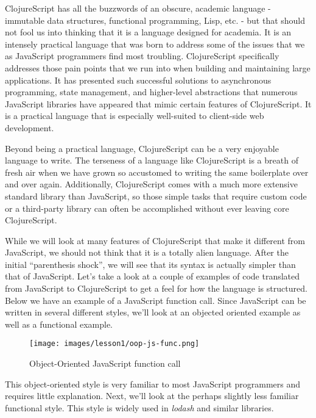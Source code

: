 \documentclass[10pt,twoside,openright]{memoir}
\begin{document}
ClojureScript has all the buzzwords of an obscure, academic language -
immutable data structures, functional programming, Lisp, etc. - but that
should not fool us into thinking that it is a language designed for
academia. It is an intensely practical language that was born to address
some of the issues that we as JavaScript programmers find most
troubling. ClojureScript specifically addresses those pain points that
we run into when building and maintaining large applications. It has
presented such successful solutions to asynchronous programming, state
management, and higher-level abstractions that numerous JavaScript
libraries have appeared that mimic certain features of ClojureScript. It
is a practical language that is especially well-suited to client-side
web development.

Beyond being a practical language, ClojureScript can be a very enjoyable
language to write. The terseness of a language like ClojureScript is a
breath of fresh air when we have grown so accustomed to writing the same
boilerplate over and over again. Additionally, ClojureScript comes with
a much more extensive standard library  than JavaScript, so those simple
tasks that require custom code or a third-party library can often be
accomplished without ever leaving core ClojureScript.

While we will look at many features of ClojureScript that make it
different from JavaScript, we should not think that it is a totally
alien language. After the initial ``parenthesis shock'', we will see
that its syntax is actually simpler than that of JavaScript. Let's take
a look at a couple of examples of code translated from JavaScript to
ClojureScript to get a feel for how the language is structured. Below we
have an example of a JavaScript function call. Since JavaScript can be
written in several different styles, we'll look at an objected oriented
example as well as a functional example.

\begin{figure}[H]
\caption{Object-Oriented JavaScript function call}
\centering
\texttt{[image: images/lesson1/oop-js-func.png]}
\end{figure}

This object-oriented style  is very familiar to most JavaScript
programmers and requires little explanation. Next, we'll look at the
perhaps slightly less familiar functional style. This style is widely
used in \emph{lodash} and similar libraries.
\end{document}
